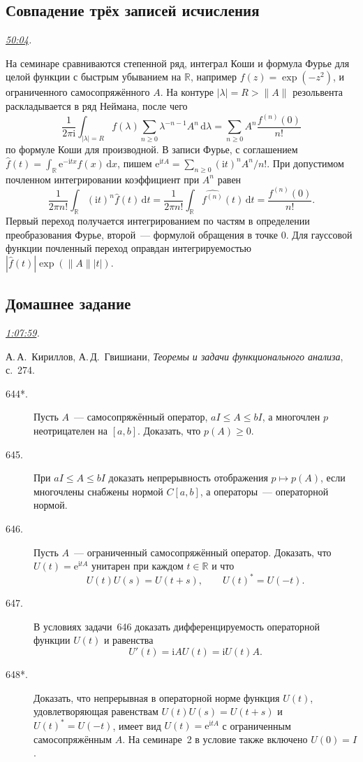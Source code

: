 \documentclass[11pt,a4paper]{article}
\theoremstyle{plain}
\theoremstyle{definition}
\newcommand{\RR}{\mathbb R}
\newcommand{\id}{I}
\newcommand{\dd}{\,\mathrm d}
\newcommand{\ii}{\mathrm i}
\newcommand{\ee}{\mathrm e}
\newcommand{\norm}[1]{\lVert#1\rVert}
\newcommand{\at}[3]{\href{https://www.youtube.com/watch?v=#1&t=#2s}{#3}}
\newcommand{\topic}[2]{\Needspace{5\baselineskip}\subsection*{#1}\noindent\emph{#2.}\par\nobreak\smallskip}
\begin{document}
\topic{Совпадение трёх записей исчисления}{\at{xOAr776deQI}{3004}{50:04}}
На семинаре сравниваются степенной ряд, интеграл Коши
и формула Фурье для целой функции с быстрым убыванием на
$\RR$, например $f(z)=\exp(-z^2)$, и ограниченного
самосопряжённого $A$. На контуре $|\lambda|=R>\norm A$
резольвента раскладывается в ряд Неймана, после чего
\[
 \frac{1}{2\pi\ii}\int_{|\lambda|=R} f(\lambda)
            \sum_{n\ge0}\lambda^{-n-1}A^n\dd\lambda
     =\sum_{n\ge0} A^n\frac{f^{(n)}(0)}{n!}
\]
по формуле Коши для производной.
В записи Фурье, с соглашением
$\widehat f(t)=\int_{\RR}\ee^{-\ii tx}f(x)\dd x$,
пишем $\ee^{\ii tA}=\sum_{n\ge0}(\ii t)^nA^n/n!$.
При допустимом почленном интегрировании коэффициент
при $A^n$ равен
\[
 \frac{1}{2\pi n!}\int_\RR (\ii t)^n\widehat f(t)\dd t
 =\frac{1}{2\pi n!}\int_\RR\widehat{f^{(n)}}(t)\dd t
 =\frac{f^{(n)}(0)}{n!}.
\]
Первый переход получается интегрированием по частям
в определении преобразования Фурье, второй~---
формулой обращения в точке $0$. Для гауссовой функции
почленный переход оправдан интегрируемостью
$|\widehat f(t)|\exp(\norm A|t|)$.
\topic{Домашнее задание}{\at{xOAr776deQI}{4079}{1:07:59}}
А.\,А.~Кириллов, А.\,Д.~Гвишиани,
\emph{Теоремы и задачи функционального анализа}, с.~274.

\begin{description}
\item[644*.] Пусть $A$~--- самосопряжённый оператор,
$a\id\le A\le b\id$, а многочлен $p$ неотрицателен на
$[a,b]$. Доказать, что $p(A)\ge0$.

\item[645.] При $a\id\le A\le b\id$ доказать
непрерывность отображения $p\mapsto p(A)$, если
многочлены снабжены нормой $C[a,b]$, а операторы~---
операторной нормой.

\item[646.] Пусть $A$~--- ограниченный самосопряжённый
оператор. Доказать, что $U(t)=\ee^{\ii tA}$ унитарен
при каждом $t\in\RR$ и что
\[
 U(t)U(s)=U(t+s),\qquad U(t)^*=U(-t).
\]

\item[647.] В условиях задачи~646 доказать
дифференцируемость операторной функции $U(t)$ и равенства
\[
 U'(t)=\ii AU(t)=\ii U(t)A.
\]

\item[648*.] Доказать, что непрерывная в операторной
норме функция $U(t)$, удовлетворяющая равенствам
$U(t)U(s)=U(t+s)$ и $U(t)^*=U(-t)$, имеет вид
$U(t)=\ee^{\ii tA}$ с ограниченным самосопряжённым $A$.
На семинаре~2 в условие также включено $U(0)=\id$.
\end{description}
\end{document}
